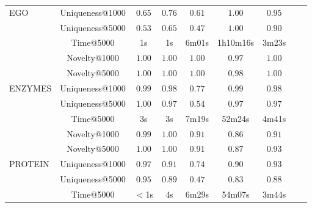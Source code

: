 \begin{table}[h!]
\begin{tabular}{lcccccccc}
          EGO & Uniqueness@1000       & $0.65$ & $0.76$ & $0.61$          & $\mathbf{1.00}$ & $0.95$\\
          & Uniqueness@5000           & $0.53$ & $0.65$ & $0.47$          & $\mathbf{1.00}$ & $0.90$\\
          & Time@5000                 & 1s       & 1s       & 6m01s             & 1h10m16s          & 3m23s\\
         \midrule
          & Novelty@1000              & $\mathbf{1.00}$ & $\mathbf{1.00}$ & $\mathbf{1.00}$          & $0.97$          & $\mathbf{1.00}$\\
          & Novelty@5000              & $\mathbf{1.00}$ & $\mathbf{1.00}$ & $\mathbf{1.00}$          & $0.98$          & $\mathbf{1.00}$\\
          ENZYMES & Uniqueness@1000   & $0.99$ & $0.98$ & $0.77$          & $\mathbf{0.99}$ & $0.98$\\
          & Uniqueness@5000           & $\mathbf{1.00}$ & $0.97$ & $0.54$          & $\mathbf{0.97}$ & $\mathbf{0.97}$\\
          & Time@5000                 & 3s       & 3s       & 7m19s             & 52m24s            & 4m41s\\
        \midrule
          & Novelty@1000              & $0.99$ & $\mathbf{1.00}$ & $0.91$          & $0.86$          & $\mathbf{0.91}$\\
          & Novelty@5000              & $\mathbf{1.00}$ & $\mathbf{1.00}$ & $0.91$          & $0.87$          & $\mathbf{0.93}$\\
          PROTEIN & Uniqueness@1000  & $0.97$ & $0.91$ & $0.74$          & $0.90$          & $\mathbf{0.93}$\\
          & Uniqueness@5000           & $0.95$ & $0.89$ & $0.47$          & $0.83$          & $\mathbf{0.88}$\\
          & Time@5000                 & $<$1s    & 4s       & 6m29s             & 54m07s            & 3m44s\\
          \bottomrule
    \end{tabular}
\end{table}